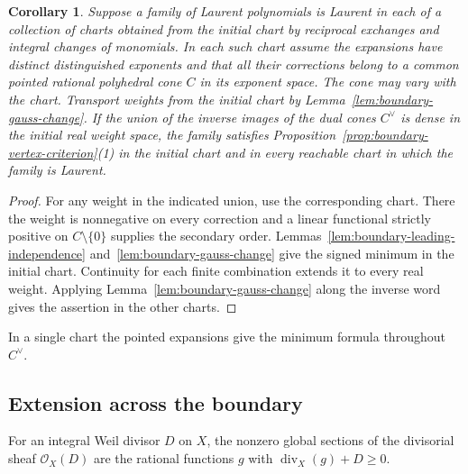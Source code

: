 \documentclass[11pt,reqno]{amsart}
\numberwithin{equation}{section}
\newtheorem{corollary}[theorem]{Corollary}
\theoremstyle{definition}
\theoremstyle{remark}
\begin{document}
\begin{corollary}\label{cor:boundary-dense-charts}
Suppose a family of Laurent polynomials is Laurent in each of a
collection of charts obtained from the initial chart by reciprocal
exchanges and integral changes of monomials. In each such chart assume
the expansions have distinct distinguished exponents and that all their
corrections belong to a common pointed rational polyhedral cone \(C\)
in its exponent space. The cone may vary with the chart. Transport
weights from the initial chart by Lemma~\ref{lem:boundary-gauss-change}.
If the union of the inverse images of the dual cones \(C^\vee\) is
dense in the initial real weight space, the family satisfies
Proposition~\ref{prop:boundary-vertex-criterion}(1) in the initial
chart and in every reachable chart in which the family is Laurent.
\end{corollary}

\begin{proof}
For any weight in the indicated union, use the corresponding chart.
There the weight is nonnegative on every correction and a linear
functional strictly positive on \(C\setminus\{0\}\) supplies the
secondary order. Lemmas~\ref{lem:boundary-leading-independence}
and~\ref{lem:boundary-gauss-change} give the signed minimum in the
initial chart. Continuity for each finite combination extends it to
every real weight. Applying Lemma~\ref{lem:boundary-gauss-change} along
the inverse word gives the assertion in the other charts.
\end{proof}

In a single chart the pointed expansions give the minimum formula
throughout \(C^\vee\).

\subsection{Extension across the boundary}

For an integral Weil divisor \(D\) on \(X\), the nonzero global
sections of the divisorial sheaf \(\mathcal O_X(D)\) are the rational
functions \(g\) with \(\operatorname{div}_X(g)+D\ge0\).
\end{document}

